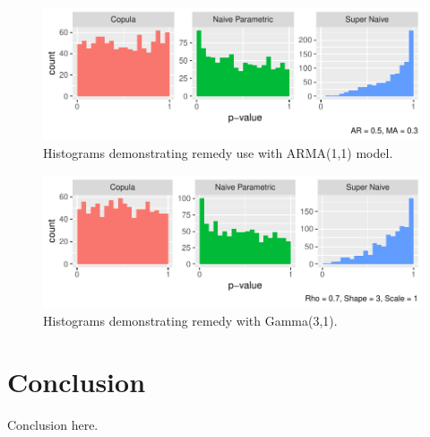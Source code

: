 \documentclass[12pt, letterpaper, titlepage]{article}
\begin{document}
\begin{figure}[tbp]
  \centering
  \includegraphics{hist_copula_arma}
  \caption{Histograms demonstrating remedy use with ARMA(1,1) model.}
  \label{fig:hist_copula_arma}
\end{figure}

\begin{figure}[tbp]
  \centering
  \includegraphics{hist_copula_gamma}
  \caption{Histograms demonstrating remedy with Gamma(3,1).}
  \label{fig:hist_copula_gamma}
\end{figure}

\hypertarget{sec:conclusion}{%
\section{Conclusion}\label{sec:conclusion}}

Conclusion here.

\citet{Butorina}
\citet{Racine}
\citet{Wang}



\end{document}
